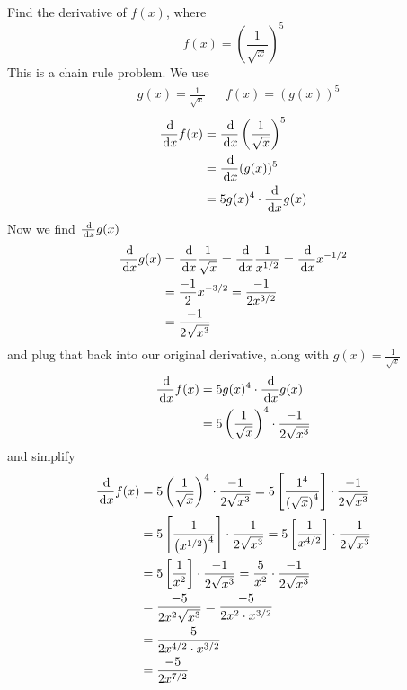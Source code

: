 \begin{ex}
  Find the derivative of $f(x)$, where
  $$ f(x)=\left(\frac{1}{\sqrt{x}}\right)^5 $$
  This is a chain rule problem. We use
  \begin{align*}
    & g(x)=\frac{1}{\sqrt{x}}
    & & f(x)={(g(x))^5}
  \end{align*}
  \begin{align*}
    \frac{\,\mathrm{d}}{\,\mathrm{d} x} f(x)&=\frac{\,\mathrm{d}}{\,\mathrm{d} x} \left(\frac{1}{\sqrt{x}}\right)^5 \\
      &= \frac{\,\mathrm{d}}{\,\mathrm{d} x} {(g(x))^5} \\
      &= 5g(x)^4 \cdot \frac{\,\mathrm{d}}{\,\mathrm{d} x} g(x)
  \end{align*}
  Now we find $ \frac{\,\mathrm{d}}{\,\mathrm{d} x} g(x) $
  \begin{align*}
    \frac{\,\mathrm{d}}{\,\mathrm{d} x} g(x) &= \frac{\,\mathrm{d}}{\,\mathrm{d} x} \frac{1}{\sqrt{x}} =\frac{\,\mathrm{d}}{\,\mathrm{d} x} \frac{1}{x^{1/2}} =\frac{\,\mathrm{d}}{\,\mathrm{d} x} x^{-1/2} \\
      &=\frac{-1}{2}x^{-3/2} =\frac{-1}{2x^{3/2}} \\
      &=\frac{-1}{2\sqrt{x^3}}
  \end{align*}
  and plug that back into our original derivative, along with $g(x)=\frac{1}{\sqrt{x}}$
  \begin{align*}
    \frac{\,\mathrm{d}}{\,\mathrm{d} x} f(x)&=5g(x)^4 \cdot \frac{\,\mathrm{d}}{\,\mathrm{d} x} g(x) \\
      &=5\left(\frac{1}{\sqrt{x}}\right)^4\cdot \frac{-1}{2\sqrt{x^3}}
  \end{align*}
  and simplify
  \begin{align*}
    \frac{\,\mathrm{d}}{\,\mathrm{d} x} f(x)&=5\left(\frac{1}{\sqrt{x}}\right)^4\cdot \frac{-1}{2\sqrt{x^3}} =5\left[\frac{1^4}{\left(\sqrt{x}\right)^4}\right] \cdot \frac{-1}{2\sqrt{x^3}} \\
    &=5\left[\frac{1}{\left(x^{1/2}\right)^4}\right] \cdot \frac{-1}{2\sqrt{x^3}}=5\left[\frac{1}{x^{4/2}}\right] \cdot \frac{-1}{2\sqrt{x^3}} \\
    &=5\left[\frac{1}{x^2}\right] \cdot \frac{-1}{2\sqrt{x^3}}=\frac{5}{x^2} \cdot \frac{-1}{2\sqrt{x^3}} \\
    &=\frac{-5}{2x^2\sqrt{x^3}} =\frac{-5}{2x^2\cdot x^{3/2}} \\
    &=\frac{-5}{2x^{4/2}\cdot x^{3/2}}\\
    &=\frac{-5}{2x^{7/2}} \\
  \end{align*}
\end{ex}
